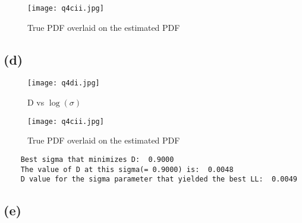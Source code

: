 \documentclass[11pt, fleqn]{article}
\begin{document}
\begin{figure}[H]
    \centering
    \texttt{[image: q4cii.jpg]}
    \caption{True PDF overlaid on the estimated PDF}
    \label{fig:my_label}
\end{figure}
\newpage

\subsection*{(d)}
\begin{figure}[H]
    \centering
    \texttt{[image: q4di.jpg]}
    \caption{D vs $\log(\sigma)$}
    \label{fig:my_label}
\end{figure}

\begin{figure}[H]
    \centering
    \texttt{[image: q4cii.jpg]}
    \caption{True PDF overlaid on the estimated PDF}
    \label{fig:my_label}
\end{figure}
\newpage

\begin{verbatim}
    Best sigma that minimizes D:  0.9000
    The value of D at this sigma(= 0.9000) is:  0.0048
    D value for the sigma parameter that yielded the best LL:  0.0049
\end{verbatim}

\subsection*{(e)}
\end{document}

